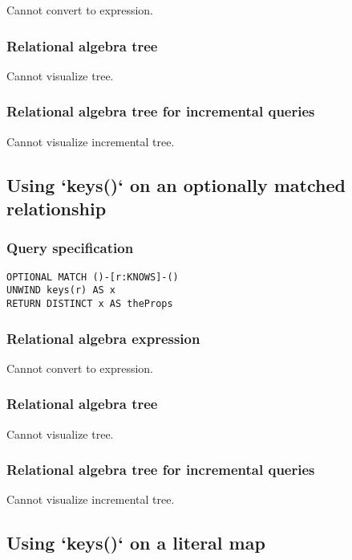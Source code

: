 Cannot convert to expression.

\subsubsection*{Relational algebra tree}

Cannot visualize tree.

\subsubsection*{Relational algebra tree for incremental queries}

Cannot visualize incremental tree.

\subsection{Using `keys()` on an optionally matched relationship}

\subsubsection*{Query specification}

\begin{lstlisting}
OPTIONAL MATCH ()-[r:KNOWS]-()
UNWIND keys(r) AS x
RETURN DISTINCT x AS theProps
\end{lstlisting}

\subsubsection*{Relational algebra expression}

Cannot convert to expression.

\subsubsection*{Relational algebra tree}

Cannot visualize tree.

\subsubsection*{Relational algebra tree for incremental queries}

Cannot visualize incremental tree.

\subsection{Using `keys()` on a literal map}

